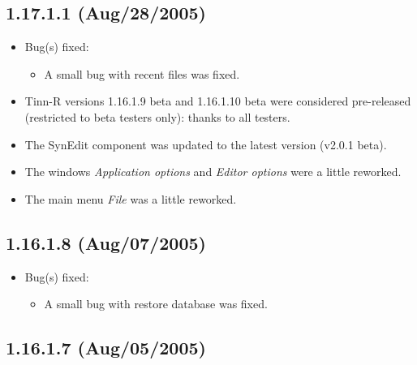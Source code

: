 \subsection{1.17.1.1 (Aug/28/2005)}

\begin{itemize}
  \item Bug(s) fixed:
    \begin{itemize}
      \item A small bug with recent files was fixed.
    \end{itemize}
  \item Tinn-R versions 1.16.1.9 beta and 1.16.1.10 beta were considered
    pre-released (restricted to beta testers only): thanks to all testers.
  \item The SynEdit component was updated to the latest version (v2.0.1 beta).
  \item The windows \textit{Application options} and \textit{Editor options}
    were a little reworked.
  \item The main menu \textit{File} was a little reworked.
\end{itemize}


\subsection{1.16.1.8 (Aug/07/2005)}

\begin{itemize}
  \item Bug(s) fixed:
    \begin{itemize}
      \item A small bug with restore database was fixed.
    \end{itemize}
\end{itemize}


\subsection{1.16.1.7 (Aug/05/2005)}

